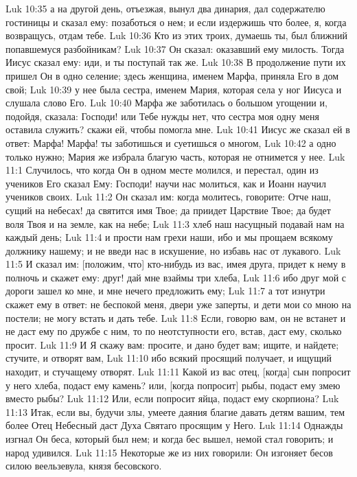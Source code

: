 Luk 10:35  а на другой день, отъезжая, вынул два динария, дал содержателю гостиницы и сказал ему: позаботься о нем; и если издержишь что более, я, когда возвращусь, отдам тебе.
Luk 10:36  Кто из этих троих, думаешь ты, был ближний попавшемуся разбойникам?
Luk 10:37  Он сказал: оказавший ему милость. Тогда Иисус сказал ему: иди, и ты поступай так же.
Luk 10:38  В продолжение пути их пришел Он в одно селение; здесь женщина, именем Марфа, приняла Его в дом свой;
Luk 10:39  у нее была сестра, именем Мария, которая села у ног Иисуса и слушала слово Его.
Luk 10:40  Марфа же заботилась о большом угощении и, подойдя, сказала: Господи! или Тебе нужды нет, что сестра моя одну меня оставила служить? скажи ей, чтобы помогла мне.
Luk 10:41  Иисус же сказал ей в ответ: Марфа! Марфа! ты заботишься и суетишься о многом,
Luk 10:42  а одно только нужно; Мария же избрала благую часть, которая не отнимется у нее.
Luk 11:1  Случилось, что когда Он в одном месте молился, и перестал, один из учеников Его сказал Ему: Господи! научи нас молиться, как и Иоанн научил учеников своих.
Luk 11:2  Он сказал им: когда молитесь, говорите: Отче наш, сущий на небесах! да святится имя Твое; да приидет Царствие Твое; да будет воля Твоя и на земле, как на небе;
Luk 11:3  хлеб наш насущный подавай нам на каждый день;
Luk 11:4  и прости нам грехи наши, ибо и мы прощаем всякому должнику нашему; и не введи нас в искушение, но избавь нас от лукавого.
Luk 11:5  И сказал им: [положим, что] кто-нибудь из вас, имея друга, придет к нему в полночь и скажет ему: друг! дай мне взаймы три хлеба,
Luk 11:6  ибо друг мой с дороги зашел ко мне, и мне нечего предложить ему;
Luk 11:7  а тот изнутри скажет ему в ответ: не беспокой меня, двери уже заперты, и дети мои со мною на постели; не могу встать и дать тебе.
Luk 11:8  Если, говорю вам, он не встанет и не даст ему по дружбе с ним, то по неотступности его, встав, даст ему, сколько просит.
Luk 11:9  И Я скажу вам: просите, и дано будет вам; ищите, и найдете; стучите, и отворят вам,
Luk 11:10  ибо всякий просящий получает, и ищущий находит, и стучащему отворят.
Luk 11:11  Какой из вас отец, [когда] сын попросит у него хлеба, подаст ему камень? или, [когда попросит] рыбы, подаст ему змею вместо рыбы?
Luk 11:12  Или, если попросит яйца, подаст ему скорпиона?
Luk 11:13  Итак, если вы, будучи злы, умеете даяния благие давать детям вашим, тем более Отец Небесный даст Духа Святаго просящим у Него.
Luk 11:14  Однажды изгнал Он беса, который был нем; и когда бес вышел, немой стал говорить; и народ удивился.
Luk 11:15  Некоторые же из них говорили: Он изгоняет бесов силою веельзевула, князя бесовского.
